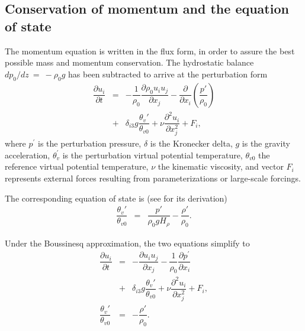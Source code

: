 \documentclass[gmd,manuscript]{copernicus}
\begin{document}
\subsection{Conservation of momentum and the equation of state}
The momentum equation is written in the flux form, in order to assure the best possible mass and momentum conservation. The hydrostatic balance $dp_0 / dz~=~-\rho_0 g$ has been subtracted to arrive at the perturbation form
\begin{eqnarray}
\nonumber \dfrac{\partial u_i}{\partial t} & = & - \dfrac{1}{\rho_0} \dfrac{\partial \rho_0 u_i u_j}{\partial x_j} 
- \dfrac{\partial}{\partial x_i}\left(\dfrac{p'}{\rho_0}\right) \\
& + & \delta_{i3} g \dfrac{\theta_v'}{\theta_{v0}} + \nu \dfrac{\partial^2 u_i}{\partial x_j^2} + F_i,\label{eq:consmoma}
\end{eqnarray}
where $p^\prime$ is the perturbation pressure, $\delta$ is the Kronecker delta, $g$ is the gravity acceleration, $\theta_v^\prime$ is the perturbation virtual potential temperature,  $\theta_{v0}$ the reference virtual potential temperature, $\nu$ the kinematic viscosity, and vector $F_i$ represents external forces resulting from parameterizations or large-scale forcings.

The corresponding equation of state is (see \citet{Bannon1996} for its derivation)
\begin{eqnarray}
\dfrac{\theta_v'}{\theta_{v0}} & = & \dfrac{p'}{\rho_0 g H_{\rho}} - \dfrac{\rho'}{\rho_0}.\label{eq:statea}
\end{eqnarray}

Under the Boussinesq approximation, the two equations simplify to
\begin{eqnarray}
\nonumber \dfrac{\partial u_i}{\partial t} & = & - \dfrac{\partial u_i u_j}{\partial x_j} - \dfrac{1}{\rho_0}\dfrac{\partial p^\prime}{\partial x_i} \\
& + & \delta_{i3} g \dfrac{\theta_v'}{\theta_{v0}} + \nu \dfrac{\partial^2 u_i}{\partial x_j^2} + F_i \label{eq:consmomb},\\
\dfrac{\theta_v'}{\theta_{v0}} & = & - \dfrac{\rho'}{\rho_0}\label{eq:stateb}.
\end{eqnarray}
\end{document}

